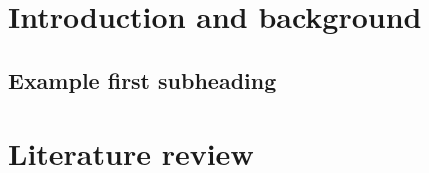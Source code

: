 \section{Introduction and background}
\label{sec:introduction}
\subsection{Example first subheading}





\section{Literature review}



\FloatBarrier %



